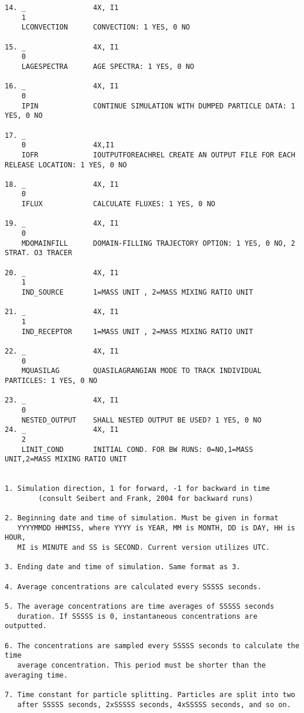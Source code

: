 \documentclass{egu}            %
\begin{document}
\begin{scriptsize}
\begin{verbatim}
14. _                4X, I1
    1
    LCONVECTION      CONVECTION: 1 YES, 0 NO

15. _                4X, I1
    0
    LAGESPECTRA      AGE SPECTRA: 1 YES, 0 NO

16. _                4X, I1
    0
    IPIN             CONTINUE SIMULATION WITH DUMPED PARTICLE DATA: 1 YES, 0 NO

17. _
    0                4X,I1
    IOFR             IOUTPUTFOREACHREL CREATE AN OUTPUT FILE FOR EACH RELEASE LOCATION: 1 YES, 0 NO

18. _                4X, I1
    0
    IFLUX            CALCULATE FLUXES: 1 YES, 0 NO

19. _                4X, I1
    0
    MDOMAINFILL      DOMAIN-FILLING TRAJECTORY OPTION: 1 YES, 0 NO, 2 STRAT. O3 TRACER

20. _                4X, I1
    1
    IND_SOURCE       1=MASS UNIT , 2=MASS MIXING RATIO UNIT

21. _                4X, I1
    1
    IND_RECEPTOR     1=MASS UNIT , 2=MASS MIXING RATIO UNIT

22. _                4X, I1
    0
    MQUASILAG        QUASILAGRANGIAN MODE TO TRACK INDIVIDUAL PARTICLES: 1 YES, 0 NO

23. _                4X, I1
    0
    NESTED_OUTPUT    SHALL NESTED OUTPUT BE USED? 1 YES, 0 NO
24. _                4X, I1
    2
    LINIT_COND       INITIAL COND. FOR BW RUNS: 0=NO,1=MASS UNIT,2=MASS MIXING RATIO UNIT
    

1. Simulation direction, 1 for forward, -1 for backward in time
        (consult Seibert and Frank, 2004 for backward runs)

2. Beginning date and time of simulation. Must be given in format
   YYYYMMDD HHMISS, where YYYY is YEAR, MM is MONTH, DD is DAY, HH is HOUR,
   MI is MINUTE and SS is SECOND. Current version utilizes UTC.

3. Ending date and time of simulation. Same format as 3.

4. Average concentrations are calculated every SSSSS seconds.

5. The average concentrations are time averages of SSSSS seconds
   duration. If SSSSS is 0, instantaneous concentrations are outputted.

6. The concentrations are sampled every SSSSS seconds to calculate the time
   average concentration. This period must be shorter than the averaging time.

7. Time constant for particle splitting. Particles are split into two
   after SSSSS seconds, 2xSSSSS seconds, 4xSSSSS seconds, and so on.


\end{verbatim}
\end{scriptsize}
\end{document}

